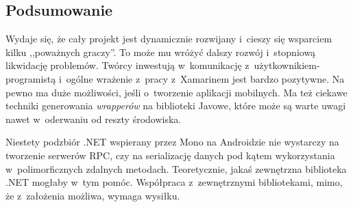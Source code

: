 \subsection{Podsumowanie}
Wydaje się, że cały projekt jest dynamicznie rozwijany i~cieszy się wsparciem kilku ,,poważnych graczy''. To może mu wróżyć dalszy rozwój i~stopniową likwidację problemów.
Twórcy inwestują w~komunikację z~użytkownikiem-programistą i~ogólne wrażenie z~pracy z~Xamarinem jest bardzo pozytywne.
Na pewno ma duże możliwości, jeśli o~tworzenie aplikacji mobilnych.
Ma też ciekawe techniki generowania \emph{wrapperów} na biblioteki Javowe, które może są warte uwagi nawet w~oderwaniu od reszty środowiska.

Niestety podzbiór .NET wspierany przez Mono na Androidzie nie wystarczy na tworzenie serwerów RPC, czy na serializację danych pod kątem wykorzystania w~polimorficznych zdalnych metodach. Teoretycznie, jakaś zewnętrzna biblioteka .NET mogłaby w~tym pomóc.
Współpraca z~zewnętrznymi bibliotekami, mimo, że z~założenia możliwa, wymaga wysiłku.

%

%
%




